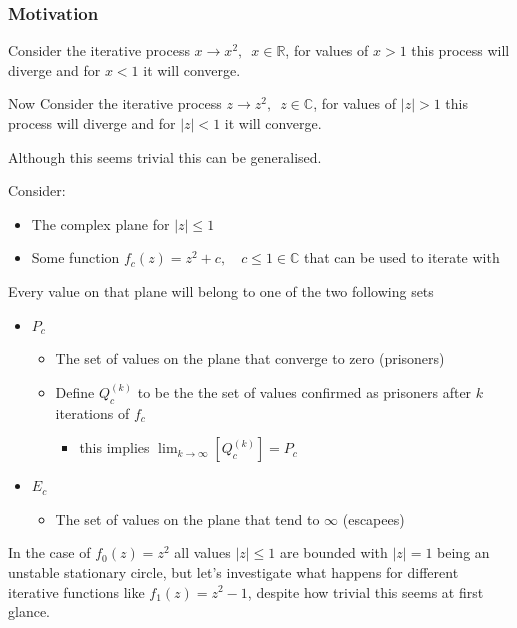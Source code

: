 \documentclass[11pt]{article}
\begin{document}
\subsubsection{Motivation}
\label{sec:orge025393}
Consider the iterative process \(x \rightarrow x^{2}, \enspace x \in \mathbb{R}\),
for values of \(x>1\) this process will diverge and for \(x<1\) it will converge.

Now Consider the iterative process \(z \rightarrow z^{2}, \enspace z \in \mathbb{C}\),
for values of \(\left\lvert z \right\rvert >1\) this process will diverge and for \(\left\lvert z \right\rvert <1\) it will converge.

Although this seems trivial this can be generalised.

Consider:

\begin{itemize}
\item The complex plane for \(\left\lvert z \right\rvert \leq 1\)
\item Some function \(f_{c}(z) = z^{2} + c, \quad c \leq 1 \in \mathbb{C}\) that can be used to iterate with
\end{itemize}

Every value on that plane will belong to one of the two following sets

\begin{itemize}
\item \(P_{c}\)
\begin{itemize}
\item The set of values on the plane that converge to zero (prisoners)
\item Define \(Q^{(k)}_{c}\) to be the the set of values confirmed as prisoners after \(k\) iterations of \(f_{c}\)
\begin{itemize}
\item this implies \(\lim_{k \rightarrow \infty} \left[ Q^{(k)}_{c}  \right] = P_{c}\)
\end{itemize}
\end{itemize}
\item \(E_{c}\)
\begin{itemize}
\item The set of values on the plane that tend to \(\infty\) (escapees)
\end{itemize}
\end{itemize}

In the case of \(f_{0}(z) = z^{2}\) all values \(\left\lvert z  \right \rvert \leq 1\) are bounded with \(\left\lvert z  \right \rvert = 1\) being an unstable stationary circle, but let's investigate what happens for different iterative functions like \(f_{1}(z) = z^{2} - 1\), despite how trivial this seems at first glance.
\end{document}
